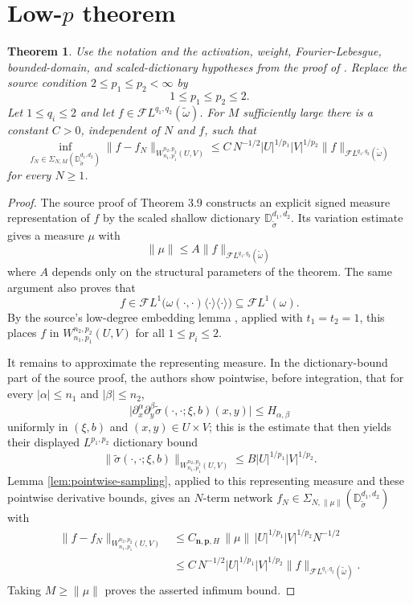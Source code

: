 \documentclass[11pt]{amsart}
\newtheorem{theorem}{Theorem}
\theoremstyle{remark}
\newcommand{\D}{\mathbb D}
\newcommand{\FL}{\mathscr F L}
\newcommand{\SigmaNM}{\Sigma_{N,M}}
\begin{document}
\section*{\texorpdfstring{Low-$p$ theorem}{Low-p theorem}}

\begin{theorem}
\label{thm:low-p-full}
Use the notation and the activation, weight, Fourier-Lebesgue, bounded-domain,
and scaled-dictionary hypotheses from the proof of
\cite[Theorem 3.9]{AbdeljawadDittrich2023}.  Replace the source condition
$2\leq p_1\leq p_2<\infty$ by
\[
        1\leq p_1\leq p_2\leq2 .
\]
Let $1\leq q_i\leq2$ and let $f\in\FL^{q_1,q_2}(\widetilde\omega)$.  For
$M$ sufficiently large there is a constant $C>0$, independent of $N$ and $f$,
such that
\[
 \inf_{f_N\in\SigmaNM(\D_{\widetilde\sigma}^{d_1,d_2})}
        \|f-f_N\|_{W_{n_1,p_1}^{n_2,p_2}(U,V)}
 \leq
 C\,N^{-1/2}|U|^{1/p_1}|V|^{1/p_2}
        \|f\|_{\FL^{q_1,q_2}(\widetilde\omega)}
\]
for every $N\geq1$.
\end{theorem}

\begin{proof}
The source proof of Theorem 3.9 constructs an explicit signed measure
representation of $f$ by the scaled shallow dictionary
$\D_{\widetilde\sigma}^{d_1,d_2}$.  Its variation estimate gives a measure
$\mu$ with
\[
        \|\mu\|
        \leq
        A\|f\|_{\FL^{q_1,q_2}(\widetilde\omega)}
\]
where $A$ depends only on the structural parameters of the theorem.  The same
argument also proves that
\[
        f\in
        \FL^1\bigl(\omega(\cdot,\cdot)\langle\cdot\rangle
              \langle\cdot\rangle\bigr)
        \subseteq \FL^1(\omega).
\]
By the source's low-degree embedding lemma
\cite[Lemma 3.7]{AbdeljawadDittrich2023}, applied with $t_1=t_2=1$, this
places $f$ in $W_{n_1,p_1}^{n_2,p_2}(U,V)$ for all $1\leq p_i\leq2$.

It remains to approximate the representing measure.  In the dictionary-bound
part of the source proof, the authors show pointwise, before integration, that
for every $|\alpha|\leq n_1$ and $|\beta|\leq n_2$,
\[
 \bigl|
 \partial_x^\alpha\partial_y^\beta
 \widetilde\sigma(\cdot,\cdot;\xi,b)(x,y)
 \bigr|
 \leq H_{\alpha,\beta}
\]
uniformly in $(\xi,b)$ and $(x,y)\in U\times V$; this is the estimate that
then yields their displayed $L^{p_1,p_2}$ dictionary bound
\[
        \|\widetilde\sigma(\cdot,\cdot;\xi,b)\|_
        {W_{n_1,p_1}^{n_2,p_2}(U,V)}
        \leq B|U|^{1/p_1}|V|^{1/p_2}.
\]
Lemma \ref{lem:pointwise-sampling}, applied to this representing measure and
these pointwise derivative bounds, gives an $N$-term network
$f_N\in\Sigma_{N,\|\mu\|}(\D_{\widetilde\sigma}^{d_1,d_2})$ with
\[
\begin{aligned}
 \|f-f_N\|_{W_{n_1,p_1}^{n_2,p_2}(U,V)}
 &\leq
 C_{\mathbf n,\mathbf p,H}\,
 \|\mu\|\,|U|^{1/p_1}|V|^{1/p_2}N^{-1/2} \\
 &\leq
 C\,N^{-1/2}|U|^{1/p_1}|V|^{1/p_2}
        \|f\|_{\FL^{q_1,q_2}(\widetilde\omega)} .
\end{aligned}
\]
Taking $M\geq\|\mu\|$ proves the asserted infimum bound.
\end{proof}
\end{document}
